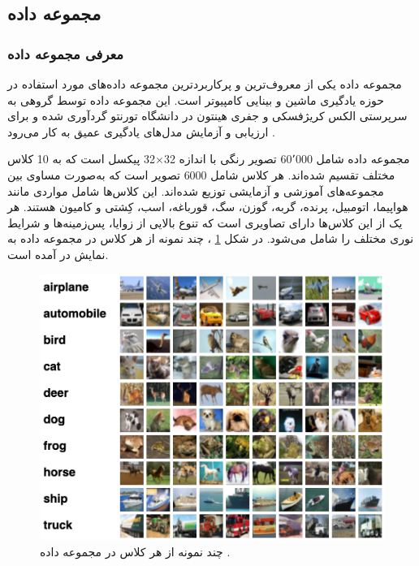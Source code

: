 \subsection{
	مجموعه داده
}

\vspace{3mm}
\subsubsection{
	معرفی مجموعه داده
}\vspace{-1mm}

مجموعه داده
یکی از معروف‌ترین و پرکاربردترین مجموعه داده‌های مورد استفاده در حوزه یادگیری ماشین و بینایی کامپیوتر است. این مجموعه داده توسط گروهی به سرپرستی الکس کریژفسکی%
و جفری هینتون%
در دانشگاه تورنتو گردآوری شده و برای ارزیابی و آزمایش مدل‌های یادگیری عمیق به کار می‌رود
\cite{krizhevsky2009learning}.


مجموعه داده
شامل 60٬000 تصویر رنگی با اندازه
32$\times$32
پیکسل است که به 10 کلاس مختلف تقسیم شده‌اند. هر کلاس شامل 6000 تصویر است که به‌صورت مساوی بین مجموعه‌های آموزشی و آزمایشی توزیع شده‌اند. این کلاس‌ها شامل مواردی مانند هواپیما، اتومبیل، پرنده، گربه، گوزن، سگ، قورباغه، اسب، کِشتی و کامیون هستند. هر یک از این کلاس‌ها دارای تصاویری است که تنوع بالایی از زوایا، پس‌زمینه‌ها و شرایط نوری مختلف را شامل می‌شود.
در شکل
\ref{cifar10}%
، چند نمونه از هر کلاس در مجموعه داده
\mbox{}
به نمایش در آمده است.


\begin{figure}[b!]
	\centering
	\includegraphics[scale=0.7]{images/chap5/cifar10.png}%
	\caption{%
		چند نمونه از هر کلاس در مجموعه داده
		\cite{Evan2022CIFAR10}.
	}
	\label{cifar10}
	\centering
\end{figure}



